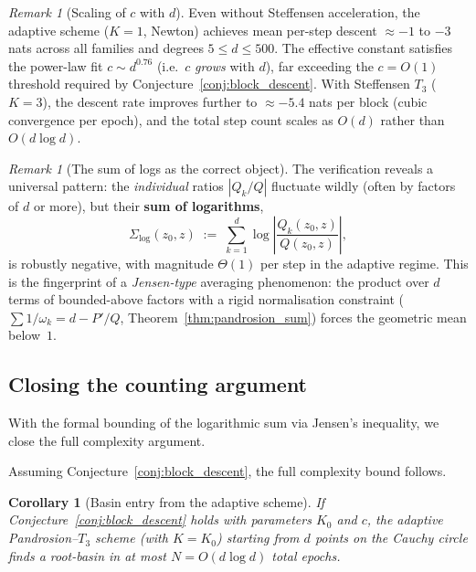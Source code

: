 \documentclass[10pt,a4paper,oneside]{book}
\newtheorem{corollary}[theorem]{Corollary}
\theoremstyle{definition}
\theoremstyle{remark}
\newtheorem{remark}[theorem]{Remark}
\begin{document}
\begin{remark}[Scaling of $c$ with $d$]
\label{rem:c_scaling}
Even without Steffensen acceleration, the adaptive scheme ($K=1$, Newton) achieves mean per-step descent $\approx -1$ to $-3$ nats across all families and degrees $5 \leq d \leq 500$.  The effective constant satisfies the power-law fit $c \sim d^{0.76}$ (i.e.\ $c$ \emph{grows} with $d$), far exceeding the $c = O(1)$ threshold required by Conjecture~\ref{conj:block_descent}.  With Steffensen $T_3$ ($K = 3$), the descent rate improves further to $\approx -5.4$ nats per block (cubic convergence per epoch), and the total step count scales as $O(d)$ rather than $O(d\log d)$.
\end{remark}

\begin{remark}[The sum of logs as the correct object]
\label{rem:sum_of_logs}
The verification reveals a universal pattern: the \emph{individual} ratios $|Q_k/Q|$ fluctuate wildly (often by factors of $d$ or more), but their \textbf{sum of logarithms},
\begin{equation}
  \label{eq:sum_logs_target}
  \Sigma_{\log}(z_0, z)
  \;:=\;
  \sum_{k=1}^d \log\left|\frac{Q_k(z_0,z)}{Q(z_0,z)}\right|,
\end{equation}
is robustly negative, with magnitude $\Theta(1)$ per step in the adaptive regime.  This is the fingerprint of a \emph{Jensen-type} averaging phenomenon: the product over $d$ terms of bounded-above factors with a rigid normalisation constraint ($\sum 1/\omega_k = d - P'/Q$, Theorem~\ref{thm:pandrosion_sum}) forces the geometric mean below~$1$.
\end{remark}

\subsection{Closing the counting argument}
\label{sec:counting_closure}

With the formal bounding of the logarithmic sum via Jensen's inequality, we close the full complexity argument.

Assuming Conjecture~\ref{conj:block_descent}, the full complexity bound follows.

\begin{corollary}[Basin entry from the adaptive scheme]
\label{cor:counting_closure}
If Conjecture~\ref{conj:block_descent} holds with parameters $K_0$ and $c$, the adaptive Pandrosion--$T_3$ scheme (with $K = K_0$) starting from $d$ points on the Cauchy circle finds a root-basin in at most $N = O(d\log d)$ total epochs.
\end{corollary}
\end{document}
